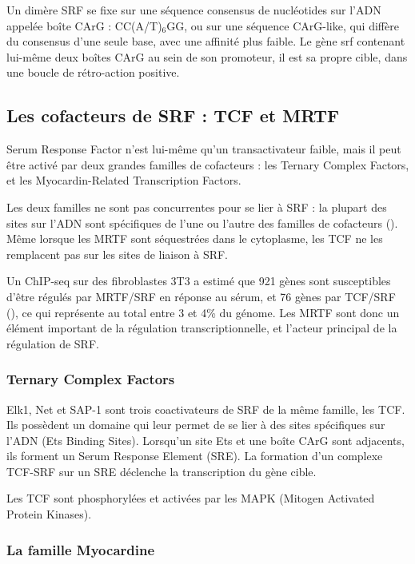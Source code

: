 Un dimère SRF se fixe sur une séquence consensus de nucléotides sur l'ADN appelée boîte CArG : CC(A/T)$_{6}$GG, ou sur une séquence CArG-like, qui diffère du consensus d'une seule base, avec une affinité plus faible. Le gène srf contenant lui-même deux boîtes CArG au sein de son promoteur, il est sa propre cible, dans une boucle de rétro-action positive. 

\subsection{Les cofacteurs de SRF : TCF et MRTF}

Serum Response Factor n'est lui-même qu'un transactivateur faible, mais il peut être activé par deux grandes familles de cofacteurs : les Ternary Complex Factors, et les Myocardin-Related Transcription Factors. 

Les deux familles ne sont pas concurrentes pour se lier à SRF : la plupart des sites sur l'ADN sont spécifiques de l'une ou l'autre des familles de cofacteurs (\cite{esnault_rho-actin_2014}). Même lorsque les MRTF sont séquestrées dans le cytoplasme, les TCF ne les remplacent pas sur les sites de liaison à SRF. 

Un ChIP-seq sur des fibroblastes 3T3 a estimé que 921 gènes sont susceptibles d'être régulés par MRTF/SRF en réponse au sérum, et 76 gènes par TCF/SRF (\cite{esnault_rho-actin_2014}), ce qui représente au total entre 3 et 4\% du génome. Les MRTF sont donc un élément important de la régulation transcriptionnelle, et l'acteur principal de la régulation de SRF. 


\subsubsection{Ternary Complex Factors}

Elk1, Net et SAP-1 sont trois coactivateurs de SRF de la même famille, les TCF. Ils possèdent un domaine qui leur permet de se lier à des sites spécifiques sur l'ADN (Ets Binding Sites). 
Lorsqu'un site Ets et une boîte CArG sont adjacents, ils forment un Serum Response Element (SRE). La formation d'un complexe TCF-SRF sur un SRE déclenche la transcription du gène cible. 

Les TCF sont phosphorylées et activées par les MAPK (Mitogen Activated Protein Kinases). 


\subsubsection{La famille Myocardine}

